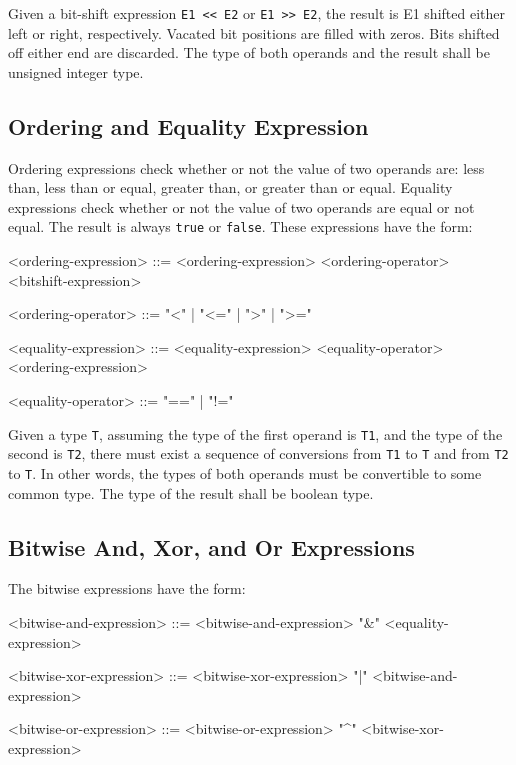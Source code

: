 Given a bit-shift expression \texttt{E1 << E2} or \texttt{E1 >> E2}, the result is E1 shifted either left or right, respectively. Vacated bit positions are filled with zeros. Bits shifted off either end are discarded. The type of both operands and the result shall be unsigned integer type.

\subsection{Ordering and Equality Expression} \label{guide:ordering_expr}

Ordering expressions check whether or not the value of two operands are: less than, less than or equal, greater than, or greater than or equal. Equality expressions check whether or not the value of two operands are equal or not equal. The result is always \texttt{true} or \texttt{false}. These expressions have the form: 

\begin{minip}
\begin{grammar}
<ordering-expression> ::= <ordering-expression> 
<ordering-operator> <bitshift-expression>

<ordering-operator> ::= "<" | "<=" | ">" | ">="

<equality-expression> ::= <equality-expression>
<equality-operator> <ordering-expression>

<equality-operator> ::= "==" | "!="
\end{grammar}
\end{minip}

Given a type \texttt{T}, assuming the type of the first operand is \texttt{T1}, and the type of the second is \texttt{T2}, there must exist a sequence of conversions from \texttt{T1} to \texttt{T} and from \texttt{T2} to \texttt{T}. In other words, the types of both operands must be convertible to some common type. The type of the result shall be boolean type.

\subsection{Bitwise And, Xor, and Or Expressions} \label{guide:bitwise_expr}

The bitwise expressions have the form:

\begin{minip}
\begin{grammar}
<bitwise-and-expression> ::= <bitwise-and-expression> "\&" <equality-expression>

<bitwise-xor-expression> ::= <bitwise-xor-expression> "|" <bitwise-and-expression>

<bitwise-or-expression> ::= <bitwise-or-expression> "^" <bitwise-xor-expression>
\end{grammar}
\end{minip}

